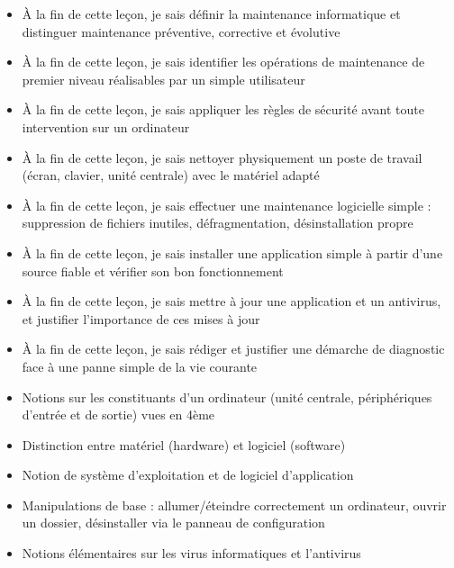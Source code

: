 \documentclass[11pt]{article}
\begin{document}
\begin{objectifs}
\begin{itemize}
\item À la fin de cette leçon, je sais définir la maintenance informatique et distinguer maintenance préventive, corrective et évolutive
\item À la fin de cette leçon, je sais identifier les opérations de maintenance de premier niveau réalisables par un simple utilisateur
\item À la fin de cette leçon, je sais appliquer les règles de sécurité avant toute intervention sur un ordinateur
\item À la fin de cette leçon, je sais nettoyer physiquement un poste de travail (écran, clavier, unité centrale) avec le matériel adapté
\item À la fin de cette leçon, je sais effectuer une maintenance logicielle simple : suppression de fichiers inutiles, défragmentation, désinstallation propre
\item À la fin de cette leçon, je sais installer une application simple à partir d'une source fiable et vérifier son bon fonctionnement
\item À la fin de cette leçon, je sais mettre à jour une application et un antivirus, et justifier l'importance de ces mises à jour
\item À la fin de cette leçon, je sais rédiger et justifier une démarche de diagnostic face à une panne simple de la vie courante
\end{itemize}
\end{objectifs}

\begin{prerequis}
\begin{itemize}
\item Notions sur les constituants d'un ordinateur (unité centrale, périphériques d'entrée et de sortie) vues en 4ème
\item Distinction entre matériel (hardware) et logiciel (software)
\item Notion de système d'exploitation et de logiciel d'application
\item Manipulations de base : allumer/éteindre correctement un ordinateur, ouvrir un dossier, désinstaller via le panneau de configuration
\item Notions élémentaires sur les virus informatiques et l'antivirus
\end{itemize}
\end{prerequis}

\newpage
\end{document}
